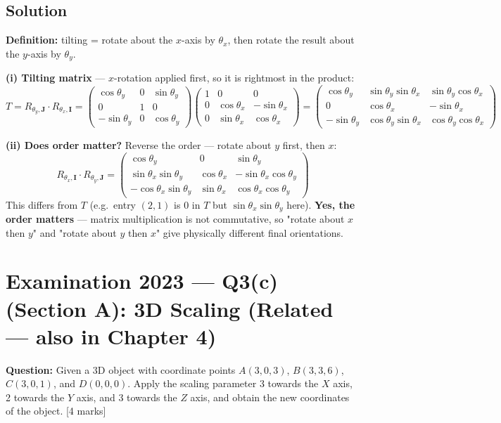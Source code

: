 \documentclass[12pt, a4paper]{article}
\newenvironment{solutionbox}{\begin{mdframed}[style=solutionframe]}{\end{mdframed}}
\begin{document}
\subsection*{Solution}
\begin{solutionbox}
\textbf{Definition:} tilting = rotate about the $x$-axis by $\theta_x$, then rotate the result about the $y$-axis by $\theta_y$.

\textbf{(i) Tilting matrix} --- $x$-rotation applied first, so it is rightmost in the product:
$$T = R_{\theta_y,\mathbf{J}}\cdot R_{\theta_x,\mathbf{I}} = \begin{pmatrix}\cos\theta_y & 0 & \sin\theta_y\\ 0 & 1 & 0\\ -\sin\theta_y & 0 & \cos\theta_y\end{pmatrix}\begin{pmatrix}1&0&0\\0&\cos\theta_x&-\sin\theta_x\\0&\sin\theta_x&\cos\theta_x\end{pmatrix} = \begin{pmatrix}\cos\theta_y & \sin\theta_y\sin\theta_x & \sin\theta_y\cos\theta_x\\ 0 & \cos\theta_x & -\sin\theta_x\\ -\sin\theta_y & \cos\theta_y\sin\theta_x & \cos\theta_y\cos\theta_x\end{pmatrix}$$

\textbf{(ii) Does order matter?} Reverse the order --- rotate about $y$ first, then $x$:
$$R_{\theta_x,\mathbf{I}}\cdot R_{\theta_y,\mathbf{J}} = \begin{pmatrix}\cos\theta_y & 0 & \sin\theta_y\\ \sin\theta_x\sin\theta_y & \cos\theta_x & -\sin\theta_x\cos\theta_y\\ -\cos\theta_x\sin\theta_y & \sin\theta_x & \cos\theta_x\cos\theta_y\end{pmatrix}$$
This differs from $T$ (e.g.\ entry $(2,1)$ is $0$ in $T$ but $\sin\theta_x\sin\theta_y$ here). \textbf{Yes, the order matters} --- matrix multiplication is not commutative, so "rotate about $x$ then $y$" and "rotate about $y$ then $x$" give physically different final orientations.
\end{solutionbox}

\section{Examination 2023 --- Q3(c) (Section A): 3D Scaling (Related --- also in Chapter 4)}
\begin{solutionbox}
\textbf{Question:} Given a 3D object with coordinate points $A(3,0,3)$, $B(3,3,6)$, $C(3,0,1)$, and $D(0,0,0)$. Apply the scaling parameter 3 towards the $X$ axis, 2 towards the $Y$ axis, and 3 towards the $Z$ axis, and obtain the new coordinates of the object. [4 marks]
\end{solutionbox}
\end{document}
